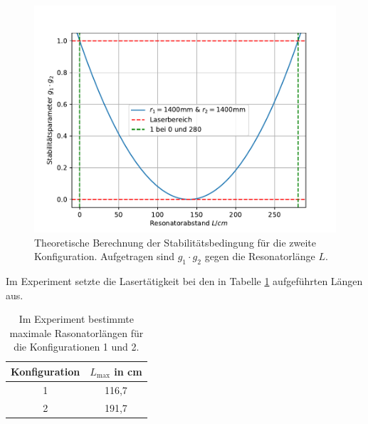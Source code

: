 \begin{figure}[H]
  \centering
  \includegraphics{plots/Vorbereitungsplot1.pdf}
  \caption{Theoretische Berechnung der Stabilitätsbedingung für die zweite Konfiguration. Aufgetragen sind
   $g_1 \cdot g_2$ gegen die Resonatorlänge $L$.}
  \label{fig:Konfig2}
\end{figure}

Im Experiment setzte die Lasertätigkeit bei den in Tabelle \ref{tab:Stabi} aufgeführten
Längen aus.
\begin{table}[H]
    \centering
    \caption{Im Experiment bestimmte maximale Rasonatorlängen für die Konfigurationen 1 und 2.}
    \label{tab:Stabi}
    \begin{tabular}{c|c}
        \toprule
        Konfiguration & $L_{\text{max}}$ in cm  \\
        \midrule
        1 & 116,7 \\
        2 & 191,7\\
        \bottomrule
    \end{tabular}
\end{table}

